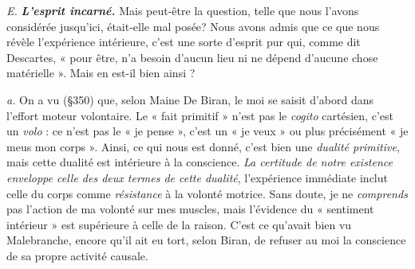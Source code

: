 {\it E.} \textbf{\textit {L'esprit incarné.}} Mais peut-être la question, telle que nous
l'avons considérée jusqu'ici, était-elle mal posée? Nous avons admis
que ce que nous révèle l’expérience intérieure, c’est une sorte d'esprit
pur qui, comme dit Descartes, « pour être, n’a besoin d'aucun lieu ni
ne dépend d’aucune chose matérielle ». Mais en est-il bien ainsi ?

{\it a.} On a vu (\S 350) que, selon Maine De Biran, le moi se saisit
d’abord dans l'effort moteur volontaire. Le « fait primitif » n’est pas
le {\it cogito} cartésien, c’est un {\it volo} : ce n’est pas le « je pense », c’est un
« je veux » ou plus précisément « je meus mon corps ». Ainsi, ce qui
nous est donné, c’est bien une {\it dualité primitive}, mais cette dualité
est intérieure à la conscience. {\it La certitude de notre existence enveloppe
celle des deux termes de cette dualité}, l'expérience immédiate inclut
celle du corps comme {\it résistance} à la volonté motrice. Sans doute,
je ne {\it comprends} pas l’action de ma volonté sur mes muscles, mais
l'évidence du « sentiment intérieur » est supérieure à celle de la
raison. C’est ce qu'avait bien vu Malebranche, encore qu’il ait eu tort,
selon Biran, de refuser au moi la conscience de sa propre activité causale.

